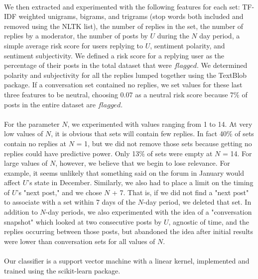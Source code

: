 \documentclass{article}
\begin{document}
\paragraph{}We then extracted and experimented with the following features for each set: TF-IDF weighted unigrams, bigrams, and trigrams (stop words both included and removed using the NLTK list), the number of replies in the set, the number of replies by a moderator, the number of posts by $U$ during the $N$ day period, a simple average risk score for users replying to $U$, sentiment polarity, and sentiment subjectivity. We defined a risk score for a replying user as the percentage of their posts in the total dataset that were $flagged$. We determined polarity and subjectivity for all the replies lumped together using the TextBlob package. If a conversation set contained no replies, we set values for these last three features to be neutral, choosing 0.07 as a neutral risk score because 7\% of posts in the entire dataset are $flagged$.

\paragraph{}For the parameter $N$, we experimented with values ranging from 1 to 14. At very low values of $N$, it is obvious that sets will contain few replies. In fact 40\% of sets contain no replies at $N$ = 1, but we did not remove those sets because getting no replies could have predictive power. Only 13\% of sets were empty at $N$ = 14. For large values of $N$, however, we believe that we begin to lose relevance. For example, it seems unlikely that something said on the forum in January would affect $U$'s state in December. Similarly, we also had to place a limit on the timing of $U$'s "next post," and we chose $N$ + 7. That is, if we did not find a "next post" to associate with a set within 7 days of the $N$-day period, we deleted that set. In addition to $N$-day periods, we also experimented with the idea of a "conversation snapshot" which looked at two consecutive posts by $U$, agnostic of time, and the replies occurring between those posts, but abandoned the idea after initial results were lower than conversation sets for all values of $N$.

\paragraph{}Our classifier is a support vector machine with a linear kernel, implemented and trained using the scikit-learn package.
\end{document}
